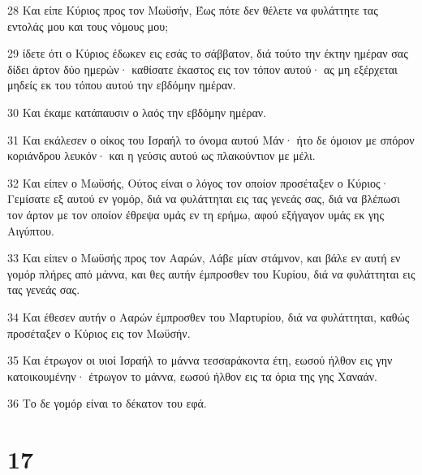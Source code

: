 \par 28 Και είπε Κύριος προς τον Μωϋσήν, Έως πότε δεν θέλετε να φυλάττητε τας εντολάς μου και τους νόμους μου;
\par 29 ίδετε ότι ο Κύριος έδωκεν εις εσάς το σάββατον, διά τούτο την έκτην ημέραν σας δίδει άρτον δύο ημερών· καθίσατε έκαστος εις τον τόπον αυτού· ας μη εξέρχεται μηδείς εκ του τόπου αυτού την εβδόμην ημέραν.
\par 30 Και έκαμε κατάπαυσιν ο λαός την εβδόμην ημέραν.
\par 31 Και εκάλεσεν ο οίκος του Ισραήλ το όνομα αυτού Μάν· ήτο δε όμοιον με σπόρον κοριάνδρου λευκόν· και η γεύσις αυτού ως πλακούντιον με μέλι.
\par 32 Και είπεν ο Μωϋσής, Ούτος είναι ο λόγος τον οποίον προσέταξεν ο Κύριος· Γεμίσατε εξ αυτού εν γομόρ, διά να φυλάττηται εις τας γενεάς σας, διά να βλέπωσι τον άρτον με τον οποίον έθρεψα υμάς εν τη ερήμω, αφού εξήγαγον υμάς εκ γης Αιγύπτου.
\par 33 Και είπεν ο Μωϋσής προς τον Ααρών, Λάβε μίαν στάμνον, και βάλε εν αυτή εν γομόρ πλήρες από μάννα, και θες αυτήν έμπροσθεν του Κυρίου, διά να φυλάττηται εις τας γενεάς σας.
\par 34 Και έθεσεν αυτήν ο Ααρών έμπροσθεν του Μαρτυρίου, διά να φυλάττηται, καθώς προσέταξεν ο Κύριος εις τον Μωϋσήν.
\par 35 Και έτρωγον οι υιοί Ισραήλ το μάννα τεσσαράκοντα έτη, εωσού ήλθον εις γην κατοικουμένην· έτρωγον το μάννα, εωσού ήλθον εις τα όρια της γης Χαναάν.
\par 36 Το δε γομόρ είναι το δέκατον του εφά.

\chapter{17}

